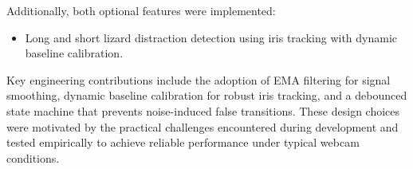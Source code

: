 \documentclass[12pt,a4paper]{article}
\begin{document}
Additionally, both optional features were implemented:
\begin{itemize}[noitemsep]
    \item Long and short lizard distraction detection using iris tracking with dynamic baseline calibration.
\end{itemize}


Key engineering contributions include the adoption of EMA filtering for signal smoothing, dynamic baseline calibration for robust iris tracking, and a debounced state machine that prevents noise-induced false transitions. These design choices were motivated by the practical challenges encountered during development and tested empirically to achieve reliable performance under typical webcam conditions.
\end{document}

